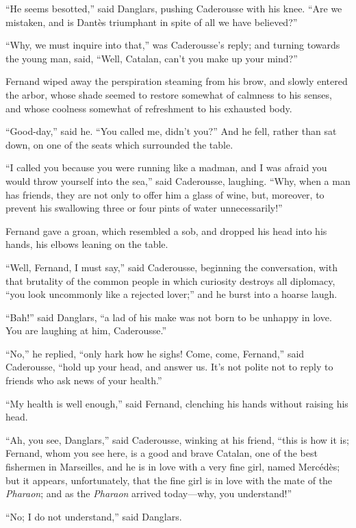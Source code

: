 “He seems besotted,” said Danglars, pushing Caderousse with his knee.
“Are we mistaken, and is Dantès triumphant in spite of all we have
believed?”

“Why, we must inquire into that,” was Caderousse’s reply; and turning
towards the young man, said, “Well, Catalan, can’t you make up your
mind?”

Fernand wiped away the perspiration steaming from his brow, and slowly
entered the arbor, whose shade seemed to restore somewhat of calmness
to his senses, and whose coolness somewhat of refreshment to his
exhausted body.

“Good-day,” said he. “You called me, didn’t you?” And he fell, rather
than sat down, on one of the seats which surrounded the table.

“I called you because you were running like a madman, and I was afraid
you would throw yourself into the sea,” said Caderousse, laughing.
“Why, when a man has friends, they are not only to offer him a glass of
wine, but, moreover, to prevent his swallowing three or four pints of
water unnecessarily!”

Fernand gave a groan, which resembled a sob, and dropped his head into
his hands, his elbows leaning on the table.

“Well, Fernand, I must say,” said Caderousse, beginning the
conversation, with that brutality of the common people in which
curiosity destroys all diplomacy, “you look uncommonly like a rejected
lover;” and he burst into a hoarse laugh.

“Bah!” said Danglars, “a lad of his make was not born to be unhappy in
love. You are laughing at him, Caderousse.”

“No,” he replied, “only hark how he sighs! Come, come, Fernand,” said
Caderousse, “hold up your head, and answer us. It’s not polite not to
reply to friends who ask news of your health.”

“My health is well enough,” said Fernand, clenching his hands without
raising his head.

“Ah, you see, Danglars,” said Caderousse, winking at his friend, “this
is how it is; Fernand, whom you see here, is a good and brave Catalan,
one of the best fishermen in Marseilles, and he is in love with a very
fine girl, named Mercédès; but it appears, unfortunately, that the fine
girl is in love with the mate of the \textit{Pharaon}; and as the \textit{Pharaon}
arrived today—why, you understand!”

“No; I do not understand,” said Danglars.

